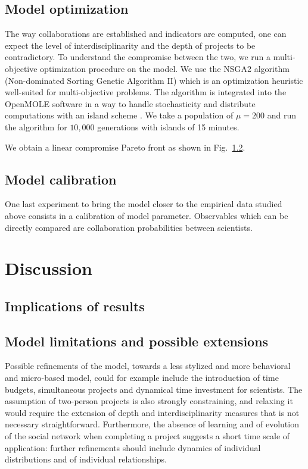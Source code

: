 \documentclass[utf8]{frontiersFPHY} %
\begin{document}
\subsection{Model optimization}

The way collaborations are established and indicators are computed, one can expect the level of interdisciplinarity and the depth of projects to be contradictory. To understand the compromise between the two, we run a multi-objective optimization procedure on the model. We use the NSGA2 algorithm (Non-dominated Sorting Genetic Algorithm II) \cite{deb2002fast} which is an optimization heuristic well-suited for multi-objective problems. The algorithm is integrated into the OpenMOLE software in a way to handle stochasticity and distribute computations with an island scheme \cite{reuillon2013openmole}. We take a population of $\mu = 200$ and run the algorithm for $10,000$ generations with islands of 15 minutes.

We obtain a linear compromise Pareto front as shown in Fig.~\ref{}.


\subsection{Model calibration}

One last experiment to bring the model closer to the empirical data studied above consists in a calibration of model parameter. Observables which can be directly compared are collaboration probabilities between scientists. 






\section{Discussion}


\subsection{Implications of results}


\subsection{Model limitations and possible extensions}

Possible refinements of the model, towards a less stylized and more behavioral and micro-based model, could for example include the introduction of time budgets, simultaneous projects and dynamical time investment for scientists. The assumption of two-person projects is also strongly constraining, and relaxing it would require the extension of depth and interdisciplinarity measures that is not necessary straightforward. Furthermore, the absence of learning and of evolution of the social network when completing a project suggests a short time scale of application: further refinements should include dynamics of individual distributions and of individual relationships.
\end{document}
